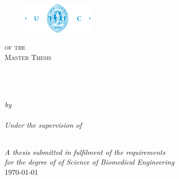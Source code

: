 \documentclass[11pt, oneside]{Thesis} %
\begin{document}
\begin{titlepage}
\begin{center}

\begin{figure}[htbp]
\centering
\includegraphics[width=0.3\textwidth]{Pictures/fctuc.png}
\end{figure}

\textsc{{\facname} of the {\univname}}\\[1.5cm] %
\textsc{\Large Master Thesis}\\[1cm] %

\HRule \\[1cm] %
{\huge \bfseries \ttitle}\\[0.4cm] %
\HRule \\[1.5cm] %
 
\begin{center} \large
\emph{by}\\
\href{}{\authornames}\\[1.5cm] %

\emph{Under the supervision of} \\[0.5cm]
{\supname}\\[3cm] %
\end{center}
 
\large \textit{A thesis submitted in fulfilment of the requirements\\ for the degree of {\degreename} of Science of Biomedical Engineering}\\[2cm] %

 
{\large \today} %
 
\vfill
\end{center}

\end{titlepage}

\pagestyle{empty} %


\clearpage
\end{document}
